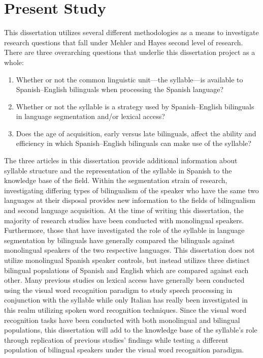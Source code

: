 
\section{Present Study}

This dissertation utilizes several different methodologies as a means to investigate research questions that fall under Mehler and Hayes \parencite*{Mehler1981-wp} second level of research. There are three overarching questions that underlie this dissertation project as a whole:
\begin{enumerate}
\item Whether or not the common linguistic unit—the syllable—is available to Spanish–English bilinguals when processing the Spanish language?
\item Whether or not the syllable is a strategy used by Spanish–English bilinguals in language segmentation and/or lexical access?
\item Does the age of acquisition, early versus late bilinguals, affect the ability and efficiency in which Spanish–English bilinguals can make use of the syllable?
\end{enumerate}

The three articles in this dissertation provide additional information about syllable structure and the representation of the syllable in Spanish to the knowledge base of the field. Within the segmentation strain of research, investigating differing types of bilingualism of the speaker who have the same two languages at their disposal provides new information to the fields of bilingualism and second language acquisition. At the time of writing this dissertation, the majority of research studies have been conducted with monolingual speakers. Furthermore, those that have investigated the role of the syllable in language segmentation by bilinguals have generally compared the bilinguals against monolingual speakers of the two respective languages. This dissertation does not utilize monolingual Spanish speaker controls, but instead utilizes three distinct bilingual populations of Spanish and English which are compared against each other. %
Many previous studies on lexical access have generally been conducted using the visual word recognition paradigm to study speech processing in conjunction with the syllable while only Italian has really been investigated in this realm utilizing spoken word recognition techniques. Since the visual word recognition tasks have been conducted with both monolingual and bilingual populations, this dissertation will add to the knowledge base of the syllable’s role through replication of previous studies' findings while testing a different population of bilingual speakers under the visual word recognition paradigm.

